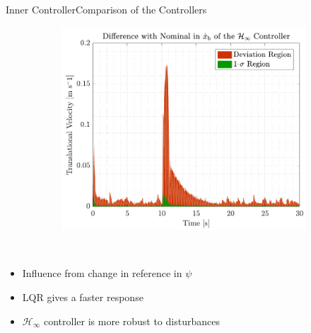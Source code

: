 \begin{frame}{Inner Controller}{Comparison of the Controllers}
\begin{figure}[H]
\begin{minipage}{0.45\linewidth}
\begin{figure}[H]
        \includegraphics[width=1\linewidth]{figures/xbdot_mc_rob_error}
      \end{figure}                
    \end{minipage}\hfill \\
  \end{figure}
\begin{itemize}
  \item Influence from change in reference in $\psi$
  \item LQR gives a faster response
  \item $\mathcal{H}_\infty$ controller is more robust to disturbances
\end{itemize}
\end{frame}



